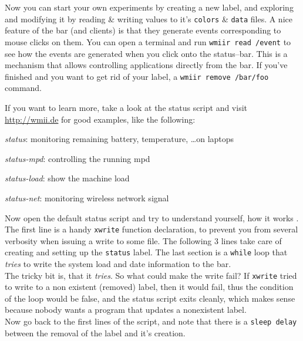 \documentclass[12pt,a4paper]{article} %
\newcommand{\hrefx}[1]{\href{#1}{#1}} %
\newenvironment{itemize*}
  {\begin{itemize}
      \setlength{\itemsep}{0pt}
      \setlength{\parskip}{0pt}}
  {\end{itemize}}
\begin{document}
    Now you can start your own experiments by creating a new label, and
    exploring and modifying it by reading \& writing values to it's
    \verb+colors+ \& \verb+data+ files.  A nice feature of the bar
    (and clients) is that they generate events corresponding to mouse
    clicks on them.  You can open a terminal and run
    \verb+wmiir read /event+ to see how the events are generated
    when you click onto the status--bar. This is a mechanism that allows
    controlling applications directly from the bar. If you've
    finished and you want to get rid of your label,
    a \verb+wmiir remove /bar/foo+ command.
    
    If you want to learn more, take a look at the status script and 
    visit \hrefx{http://wmii.de} for good examples, like the following:

    \begin{itemize*}
    \item \emph{status}: monitoring remaining battery, temperature, \dots on laptops
    \item \emph{status-mpd}: controlling the running mpd
    \item \emph{status-load}: show the machine load
    \item \emph{status-net}: monitoring wireless network signal
    \end{itemize*}
    
    Now open the default status script and try to understand yourself,
    how it works . The first line is a handy
    \verb+xwrite+ function declaration, to prevent you from several verbosity
    when issuing a write to some file. The following 3 lines take care of
    creating and setting up the \verb+status+ label. The last section is a
    \verb+while+ loop
    that \emph{tries} to write the system load and date information
    to the bar.\\
    
    The tricky bit is, that it \emph{tries}. So what could make the write
    fail? If \verb+xwrite+ tried to write to a non existent (removed)
    label, then it would fail, thus the condition of the loop would be
    false, and the status script exits cleanly, which makes sense
    because nobody wants a program that updates a nonexistent label.\\

    Now go back to the first lines of the script, and note 
    that there is a \verb+sleep delay+ between the removal of the
    label and it's creation.
    
\end{document}
